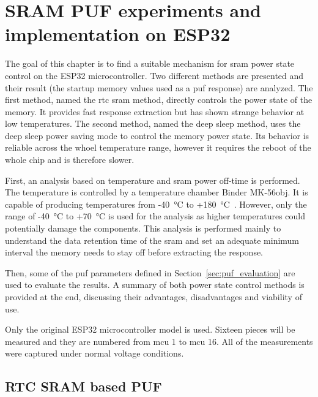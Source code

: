 \chapter{SRAM PUF experiments and implementation on ESP32}\label{sec:implementation}

\vspace{-1cm}


The goal of this chapter is to find a suitable mechanism for \gls{sram} power state control on the ESP32 microcontroller. Two different methods are presented and their result (the startup memory values used as a \gls{puf} response) are analyzed. The first method, named the \gls{rtc} \gls{sram} method, directly controls the power state of the memory. It provides fast response extraction but has shown strange behavior at low temperatures. The second method, named the deep sleep method, uses the deep sleep power saving mode to control the memory power state. Its behavior is reliable across the whoel temperature range, however it requires the reboot of the whole chip and is therefore slower. 

First, an analysis based on temperature and \gls{sram} power off-time is performed. The temperature is controlled by a temperature chamber Binder MK-56obj. It is capable of producing temperatures from -40~°C to +180~°C~\cite{Binder2021}. However, only the range of -40~°C to +70~°C is used for the analysis as higher temperatures could potentially damage the components. This analysis is performed mainly to understand the data retention time of the \gls{sram} and set an adequate minimum interval the memory needs to stay off before extracting the response.

Then, some of the \gls{puf} parameters defined in Section~\ref{sec:puf_evaluation} are used to evaluate the results. A summary of both power state control methods is provided at the end, discussing their advantages, disadvantages and viability of use.

Only the original ESP32 microcontroller model is used. Sixteen pieces will be measured and they are numbered from \gls{mcu} 1 to \gls{mcu} 16. All of the measurements were captured under normal voltage conditions. 

\section{RTC SRAM based PUF}


